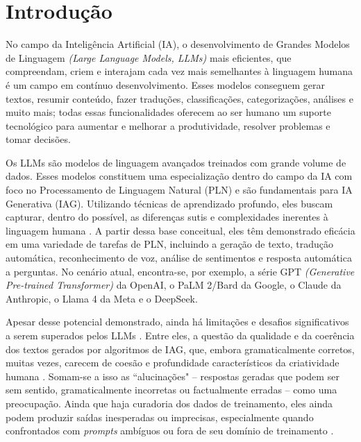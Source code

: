 \documentclass[portuguese]{textolivre}
\begin{document}
\section{Introdução}
No campo da Inteligência Artificial (IA), o desenvolvimento de Grandes Modelos de Linguagem \textit{(Large Language Models, LLMs)} mais eficientes, que compreendam, criem e interajam cada vez mais semelhantes à linguagem humana \cite[p. 406]{jurafsky2023} é um campo em contínuo desenvolvimento. Esses modelos conseguem gerar textos, resumir conteúdo, fazer traduções, classificações, categorizações, análises e muito mais; todas essas funcionalidades oferecem ao ser humano um suporte tecnológico para aumentar e melhorar a produtividade, resolver problemas e tomar decisões.

Os LLMs são modelos de linguagem avançados treinados com grande volume de dados. Esses modelos constituem uma especialização dentro do campo da IA com foco no Processamento de Linguagem Natural (PLN) e são fundamentais para IA Generativa (IAG). Utilizando técnicas de aprendizado profundo, eles buscam capturar, dentro do possível, as diferenças sutis e complexidades inerentes à linguagem humana \cite[p. 23]{chang2023}. A partir dessa base conceitual, eles têm demonstrado eficácia em uma variedade de tarefas de PLN, incluindo a geração de texto, tradução automática, reconhecimento de voz, análise de sentimentos e resposta automática a perguntas. No cenário atual, encontra-se, por exemplo, a série GPT \textit{(Generative Pre-trained Transformer)} da OpenAI, o PaLM 2/Bard da Google, o Claude da Anthropic, o Llama 4 da Meta e o DeepSeek.

Apesar desse potencial demonstrado, ainda há limitações e desafios significativos a serem superados pelos LLMs \cite{jovanovic2022}. Entre eles, a questão da qualidade e da coerência dos textos gerados por algoritmos de IAG, que, embora gramaticalmente corretos, muitas vezes, carecem de coesão e profundidade característicos da criatividade humana \cite{santo2023}. Somam-se a isso as ``alucinações" -- respostas geradas que podem ser sem sentido, gramaticalmente incorretas ou factualmente erradas \cite{alkaissi2023} -- como uma preocupação. Ainda que haja curadoria dos dados de treinamento, eles ainda podem produzir saídas inesperadas ou imprecisas, especialmente quando confrontados com \textit{prompts} ambíguos ou fora de seu domínio de treinamento \cite[p. 45]{kaufman2022}.
\end{document}
